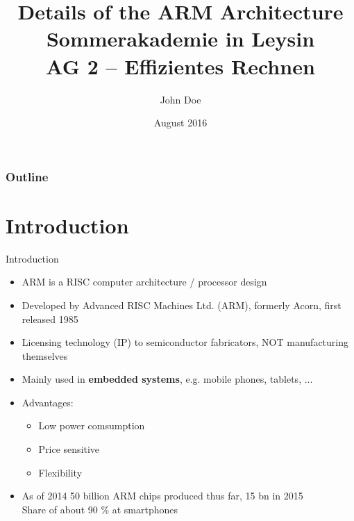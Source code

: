 \documentclass{beamer}
\title[ARM Architecture]{%
	\Large Details of the ARM Architecture\\
	[5mm] \normalsize Sommerakademie in Leysin\\
	AG 2 -- Effizientes Rechnen
}
\author[John Doe]{John Doe}
\institute[]{%
	University of Awesomeness\\[3mm]
}
\date{August 2016}
\begin{document}
\begin{frame}
	\titlepage
\end{frame}

\begin{frame}
	\frametitle{Outline}
	\tableofcontents
\end{frame}

\section{Introduction}

\AtBeginSubsection[]{%
  \begin{frame}
  \tableofcontents[currentsubsection]
  \end{frame}
}

\begin{frame}[t]{Introduction}
  \begin{itemize}
    \item ARM is a RISC computer architecture / processor design
    \pause
    \item Developed by Advanced RISC Machines Ltd. (ARM), formerly Acorn, first released 1985
    \pause
    \item Licensing technology (IP) to semiconductor fabricators, NOT manufacturing themselves
    \pause
    \item Mainly used in \textbf{embedded systems}, e.g. mobile phones, tablets, ...
    \pause
    \item Advantages:
    \begin{itemize}
        \item Low power comsumption
        \item Price sensitive
        \item Flexibility
    \end{itemize}
    \pause
    \item As of 2014 50 billion ARM chips produced thus far, 15 bn in 2015\\ Share of about 90 \% at smartphones
  \end{itemize}
\end{frame}
\end{document}
